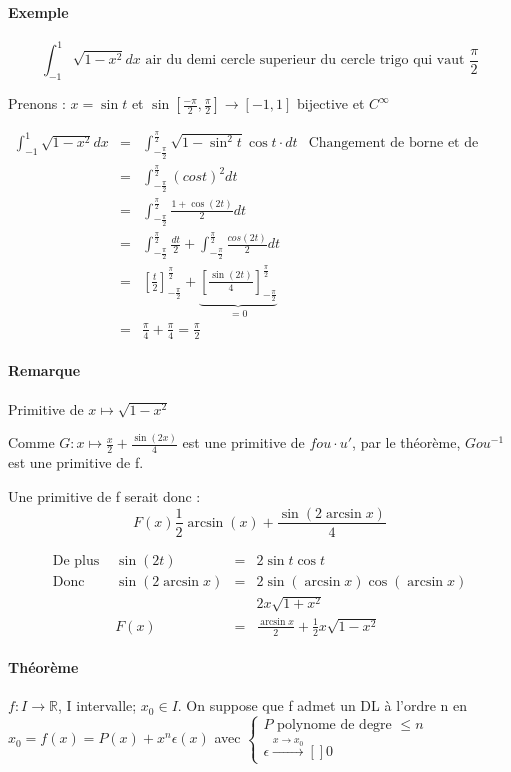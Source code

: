 \paragraph{Exemple}

\[\int_{-1}^1 \sqrt{1-x^2} dx \text{ air du demi cercle superieur du cercle trigo qui vaut } \frac{\pi}{2}\]

Prenons : $x = \sin t$ et $\sin [\frac{-\pi}{2}, \frac{\pi}{2}] \rightarrow [-1, 1]$ bijective et $C^\infty$

\[\begin{array}{rclr}
\int_{-1}^1 \sqrt{1-x^2}dx &=& \int_{-\frac{\pi}{2}}^{\frac{\pi}{2}} \sqrt{1-\sin^2t} \cos t\cdot dt & \text{Changement de borne et de variable où l'on dérive} \\
&=& \int_{-\frac{\pi}{2}}^{\frac{\pi}{2}} (cost)^2 dt \\
&=& \int_{-\frac{\pi}{2}}^{\frac{\pi}{2}} \frac{1+\cos(2t)}{2} dt \\
&=& \int_{-\frac{\pi}{2}}^{\frac{\pi}{2}} \frac{dt}{2} + \int_{-\frac{\pi}{2}}^{\frac{\pi}{2}} \frac{cos(2t)}{2}dt \\
&=& [\frac{t}{2}]^{\frac{\pi}{2}}_{-\frac{\pi}{2}} + \underbrace{[\frac{\sin(2t)}{4}]^{\frac{\pi}{2}}_{-\frac{\pi}{2}}}_{=0} \\
&=& \frac{\pi}{4} +\frac{\pi}{4} = \frac{\pi}{2} \end{array}\]

\paragraph{Remarque} Primitive de $x\mapsto \sqrt{1-x^2}$

Comme $G: x \mapsto \frac{x}{2} + \frac{\sin(2x)}{4}$ est une primitive de $fou\cdot u'$, par le théorème, $Gou^{-1}$ est une primitive de f.

Une primitive de f serait donc : \[F(x) \frac{1}{2} \arcsin (x) + \frac{\sin(2 \arcsin x)}{4}\]

\[\begin{array}{lrcl}
\text{De plus } & \sin(2t) &=& 2\sin t \cos t \\
\text{Donc } & \sin(2\arcsin x) &=& 2 \sin(\arcsin x)\cos(\arcsin x) \\
&&& 2x\sqrt{1+x^2}\\
&F(x) &=& \frac{\arcsin x}{2} + \frac{1}{2}x\sqrt{1-x^2}
\end{array}\]

\paragraph{Théorème} $f: I \rightarrow \mathbb{R}$, I intervalle; $x_0 \in I$. On suppose que f admet un DL à l'ordre n en $x_0 = f(x) =  P(x) + x^n\epsilon(x)$ avec $\left\{
\begin{array}{c}
P \text{ polynome de degre } \leq n \\
\epsilon \xrightarrow{x \to x_0}[] 0 \end{array}\right.$

